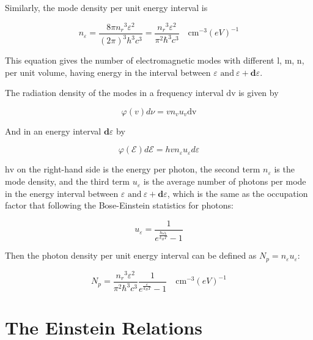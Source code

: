 Similarly, the mode density per unit energy interval is

\begin{equation}
n_{\varepsilon} = \frac{8\pi{n_{r}}^{3}\varepsilon^{2}}{\left( 2\pi \right)^{3}h^{3}c^{3}} = \frac{{n_{r}}^{3}\varepsilon^{2}}{\pi^{2}\hbar^{3}c^{3}}\quad
\text{cm}^{- 3}{(eV)}^{- 1}
\end{equation}

This equation gives the number of electromagnetic modes with different
l, m, n, per unit volume, having energy in the interval between
\(\varepsilon\text{\ and}\ {\varepsilon +}\mathbf{d}\varepsilon\).

The radiation density of the modes in a frequency interval \(\text{dv}\)
is given by

\begin{equation}
  \varphi\left( v \right)d\nu = vn_{v}u_{v}\text{dv}
\end{equation}

And in an energy interval \(\mathbf{d}\varepsilon\) by

\begin{equation}
\varphi\left( \mathcal{E} \right)d\mathcal{E} = hvn_{\varepsilon}u_{\varepsilon}d\varepsilon
\end{equation}

\(\text{hv}\) on the right-hand side is the energy per photon, the second term
\(n_{\varepsilon}\) is the mode density, and the third term \(u_{\varepsilon}\)
is the average number of photons per mode in the energy interval between
\(\varepsilon\text{\ and}\ {\varepsilon +}\mathbf{d}\varepsilon\), which is the
same as the occupation factor that following the Bose-Einstein statistics for photons:

\begin{equation}
  u_{\varepsilon} = \frac{1}{e^{\frac{\hbar\omega_{k}}{k_{B}T}} - 1}
  \label{eq:occupationfactor}
\end{equation}

Then the photon density per unit energy interval can be defined as $N_{p} =
n_{\varepsilon}u_{\varepsilon}$:

\begin{equation}
  N_{p} = \frac{{n_{r}}^{3}\varepsilon^{2}}{\pi^{2}\hbar^{3}c^{3}}\frac{1}{e^{\frac{\varepsilon}{k_{B}T}} - 1} \quad \text{cm}^{- 3}{(eV)}^{- 1}
  \label{eq:photondensity}
\end{equation}

\section{The Einstein Relations}\label{einstein-relations}

